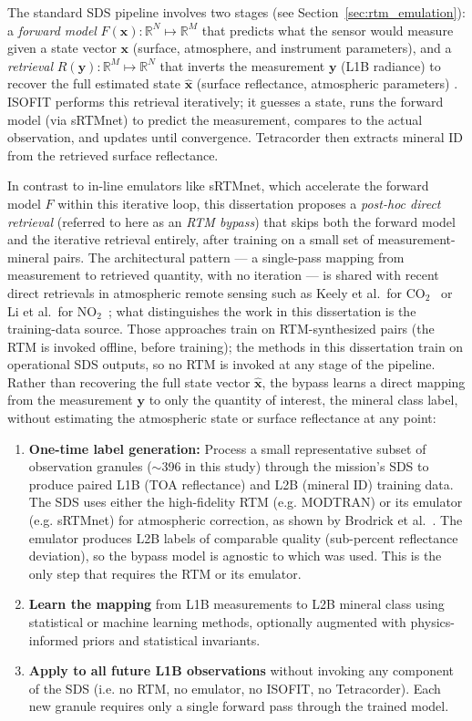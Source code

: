 \documentclass[11pt]{report}
\newcommand{\R}{\mathbb{R}}
\begin{document}
The standard SDS pipeline involves two stages (see Section~\ref{sec:rtm_emulation}): a \emph{forward model} $F(\mathbf{x}): \R^N \mapsto \R^M$ that predicts what the sensor would measure given a state vector $\mathbf{x}$ (surface, atmosphere, and instrument parameters), and a \emph{retrieval} $R(\mathbf{y}): \R^M \mapsto \R^N$ that inverts the measurement $\mathbf{y}$ (L1B radiance) to recover the full estimated state $\hat{\mathbf{x}}$ (surface reflectance, atmospheric parameters) \cite{thompson2018}.
ISOFIT performs this retrieval iteratively; it guesses a state, runs the forward model (via sRTMnet) to predict the measurement, compares to the actual observation, and updates until convergence.
Tetracorder then extracts mineral ID from the retrieved surface reflectance.

In contrast to in-line emulators like sRTMnet, which accelerate the forward model $F$ within this iterative loop, this dissertation proposes a \emph{post-hoc direct retrieval} (referred to here as an \emph{RTM bypass}) that skips both the forward model and the iterative retrieval entirely, after training on a small set of measurement-mineral pairs.
The architectural pattern --- a single-pass mapping from measurement to retrieved quantity, with no iteration --- is shared with recent direct retrievals in atmospheric remote sensing such as Keely et al.\ for {CO}$_2$~\cite{Keely2025ConditionalDiffusionCO2} or Li et al.\ for {NO}$_2$~\cite{Li2022NO2NN}; what distinguishes the work in this dissertation is the training-data source. Those approaches train on RTM-synthesized pairs (the RTM is invoked offline, before training); the methods in this dissertation train on operational SDS outputs, so no RTM is invoked at any stage of the pipeline.
Rather than recovering the full state vector $\hat{\mathbf{x}}$, the bypass learns a direct mapping from the measurement $\mathbf{y}$ to only the quantity of interest, the mineral class label, without estimating the atmospheric state or surface reflectance at any point:
\begin{enumerate}
  \item \textbf{One-time label generation:} Process a small representative subset of observation granules ($\sim$396 in this study) through the mission's SDS to produce paired L1B (TOA reflectance) and L2B (mineral ID) training data.
  The SDS uses either the high-fidelity RTM (e.g. MODTRAN) or its emulator (e.g. sRTMnet) for atmospheric correction, as shown by Brodrick et al.\ \cite{brodrick2021}.
  The emulator produces L2B labels of comparable quality (sub-percent reflectance deviation), so the bypass model is agnostic to which was used.
  This is the only step that requires the RTM or its emulator.
  \item \textbf{Learn the mapping} from L1B measurements to L2B mineral class using statistical or machine learning methods, optionally augmented with physics-informed priors and statistical invariants.
  \item \textbf{Apply to all future L1B observations} without invoking any component of the SDS (i.e. no RTM, no emulator, no ISOFIT, no Tetracorder).
  Each new granule requires only a single forward pass through the trained model.
\end{enumerate}
\end{document}
